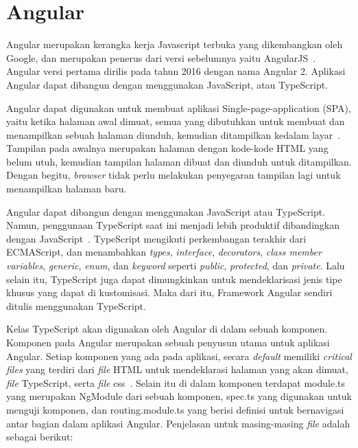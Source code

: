 \section{Angular}
\label{sec:angular} 
Angular merupakan kerangka kerja Javascript terbuka yang dikembangkan oleh Google, dan merupakan penerus dari versi sebelumnya yaitu AngularJS~\cite{fain:18:angular}. Angular versi pertama dirilis pada tahun 2016 dengan nama Angular 2. Aplikasi Angular dapat dibangun dengan menggunakan JavaScript, atau TypeScript.

Angular dapat digunakan untuk membuat aplikasi Single-page-application (SPA), yaitu ketika halaman awal dimuat, semua yang dibutuhkan untuk membuat dan menampilkan sebuah halaman diunduh, kemudian ditampilkan kedalam layar~\cite{scott:15:spa}. Tampilan pada awalnya merupakan halaman dengan kode-kode HTML yang belum utuh, kemudian tampilan halaman dibuat dan diunduh untuk ditampilkan. Dengan begitu, \textit{browser} tidak perlu melakukan penyegaran tampilan lagi untuk menampilkan halaman baru.

Angular dapat dibangun dengan menggunakan JavaScript atau TypeScript. Namun, penggunaan TypeScript saat ini menjadi lebih produktif dibandingkan dengan JavaScript~\cite{fain:18:angular}. TypeScript mengikuti perkembangan terakhir dari ECMAScript, dan menambahkan \textit{types}, \textit{interface}, \textit{decorators}, \textit{class member variables}, \textit{generic}, \textit{enum}, dan \textit{keyword} seperti \textit{public}, \textit{protected}, dan \textit{private}. Lalu selain itu, TypeScript juga dapat dimungkinkan untuk mendeklarisasi jenis tipe khusus yang dapat di kustomisasi. Maka dari itu, Framework Angular sendiri ditulis menggunakan TypeScript.

Kelas TypeScript akan digunakan oleh Angular di dalam sebuah komponen. Komponen pada Angular merupakan sebuah penyusun utama untuk aplikasi Angular. Setiap komponen yang ada pada aplikasi, secara \textit{default} memiliki \textit{critical files} yang terdiri dari \textit{file} HTML untuk mendeklarasi halaman yang akan dimuat, \textit{file} TypeScript, serta \textit{file} css~\cite{gion:18:mastering}. Selain itu di dalam komponen terdapat module.ts yang merupakan NgModule dari sebuah komponen, spec.ts yang digunakan untuk menguji komponen, dan routing.module.ts yang berisi definisi untuk bernavigasi antar bagian dalam aplikasi Angular. Penjelasan untuk masing-masing \textit{file} adalah sebagai berikut:

